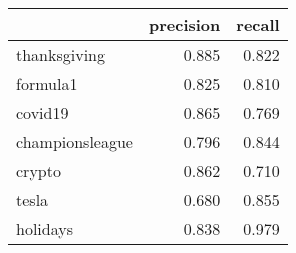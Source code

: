 \begin{tabular}{lrr}
\toprule
{} &  precision &  recall \\
\midrule
thanksgiving    &      0.885 &   0.822 \\
formula1        &      0.825 &   0.810 \\
covid19         &      0.865 &   0.769 \\
championsleague &      0.796 &   0.844 \\
crypto          &      0.862 &   0.710 \\
tesla           &      0.680 &   0.855 \\
holidays        &      0.838 &   0.979 \\
\bottomrule
\end{tabular}
